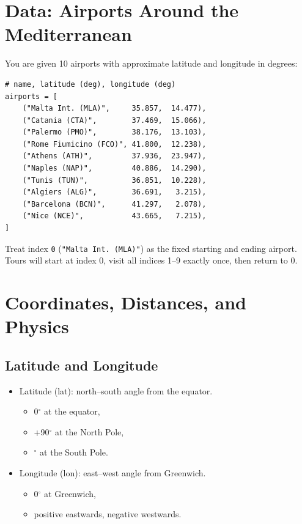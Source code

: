 \documentclass[11pt]{article}
\begin{document}
\section{Data: Airports Around the Mediterranean}
You are given 10 airports with approximate latitude and longitude in degrees:

\begin{verbatim}
# name, latitude (deg), longitude (deg)
airports = [
    ("Malta Int. (MLA)",     35.857,  14.477),
    ("Catania (CTA)",        37.469,  15.066),
    ("Palermo (PMO)",        38.176,  13.103),
    ("Rome Fiumicino (FCO)", 41.800,  12.238),
    ("Athens (ATH)",         37.936,  23.947),
    ("Naples (NAP)",         40.886,  14.290),
    ("Tunis (TUN)",          36.851,  10.228),
    ("Algiers (ALG)",        36.691,   3.215),
    ("Barcelona (BCN)",      41.297,   2.078),
    ("Nice (NCE)",           43.665,   7.215),
]
\end{verbatim}

Treat index \texttt{0} (\texttt{"Malta Int. (MLA)"}) as the fixed starting and ending airport. Tours will start at index 0, visit all indices 1--9 exactly once, then return to 0.

\section{Coordinates, Distances, and Physics}
\subsection{Latitude and Longitude}
\begin{itemize}
    \item Latitude (lat): north--south angle from the equator.
    \begin{itemize}
        \item 0$^\circ$ at the equator,
        \item +90$^\circ$ at the North Pole,
        \item {}$^\circ$ at the South Pole.
    \end{itemize}
    \item Longitude (lon): east--west angle from Greenwich.
    \begin{itemize}
        \item 0$^\circ$ at Greenwich,
        \item positive eastwards, negative westwards.
    \end{itemize}
\end{itemize}
\end{document}
